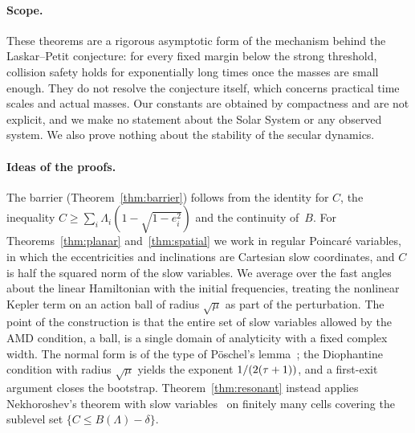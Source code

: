 \paragraph{Scope.} These theorems are a rigorous asymptotic form of the mechanism behind the Laskar--Petit conjecture: for every fixed margin below the strong threshold, collision safety holds for exponentially long times once the masses are small enough. They do not resolve the conjecture itself, which concerns practical time scales and actual masses. Our constants are obtained by compactness and are not explicit, and we make no statement about the Solar System or any observed system. We also prove nothing about the stability of the secular dynamics.

\paragraph{Ideas of the proofs.} The barrier (Theorem~\ref{thm:barrier}) follows from the identity for $C$, the inequality $C\geq\sum_i\Lambda_i(1-\sqrt{1-e_i^2})$ and the continuity of~$B$. For Theorems~\ref{thm:planar} and~\ref{thm:spatial} we work in regular Poincar\'e variables, in which the eccentricities and inclinations are Cartesian slow coordinates, and $C$ is half the squared norm of the slow variables. We average over the fast angles about the linear Hamiltonian with the initial frequencies, treating the nonlinear Kepler term on an action ball of radius $\sqrt\mu$ as part of the perturbation. The point of the construction is that the entire set of slow variables allowed by the AMD condition, a ball, is a single domain of analyticity with a fixed complex width. The normal form is of the type of P\"oschel's lemma~\cite[p.~192]{Pos93}; the Diophantine condition with radius $\sqrt\mu$ yields the exponent $1/(2(\tau+1))$, and a first-exit argument closes the bootstrap. Theorem~\ref{thm:resonant} instead applies Nekhoroshev's theorem with slow variables~\cite[Theorem~4.4]{Nek77} on finitely many cells covering the sublevel set $\{C\leq B(\Lambda)-\delta\}$.

